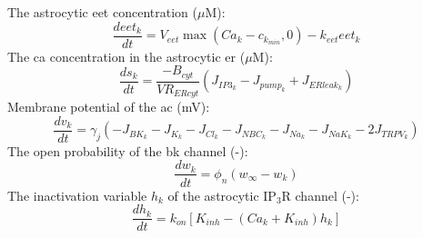 \documentclass[11pt]{elsarticle}
\newcommand{\uM}{$\mu$M\xspace}
\newcommand{\ca}{\gls{ca}\xspace}
\begin{document}
%
The astrocytic \gls{eet} concentration (\uM):
\begin{equation}
\frac{d eet_k}{dt} = V_{eet} \max(Ca_k - c_{k_{min}}, 0) - k_{eet} eet_k
\end{equation}
%
The \ca concentration in the astrocytic \gls{er} (\uM):
\begin{equation}
\frac{d s_k}{dt} =  \frac{ -B_{cyt} }{VR_{ERcyt}} \left( J_{IP3_k} - J_{pump_k} + J_{ERleak_k} \right)
\end{equation}
%
Membrane potential of the \gls{ac} (mV):
\begin{equation} \label{eq:v_k}
\frac{d v_k}{dt} = \gamma_j ( -J_{BK_k} - J_{K_k} - J_{Cl_k} - J_{NBC_k} - J_{Na_k} - J_{NaK_k} - 2J_{TRPV_k})
\end{equation}
%
The open probability of the \gls{bk} channel (-):
\begin{equation}
\frac{d w_k}{dt} = \phi_n ( w_{\infty} - w_k)
\end{equation} 
%
The inactivation variable $h_k$ of the astrocytic IP$_3$R channel (-):
\begin{equation}
\frac{d h_k}{dt} = k_{on} \left[ K_{inh} - (Ca_k + K_{inh}) h_k \right]
\end{equation}
\end{document}

